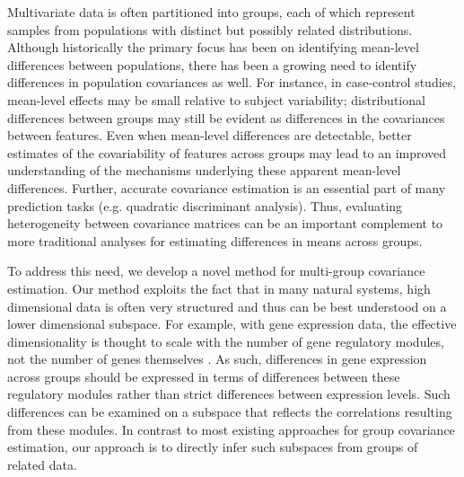 \documentclass[12pt]{article}
\begin{document}

Multivariate data is often partitioned into
groups, each of which represent samples from populations with
distinct but possibly related distributions.  Although historically the
primary focus has been on identifying mean-level differences between
populations, there has been a growing need to identify differences in
population covariances as well.  For instance, in case-control studies, mean-level effects may be small relative to subject
variability; distributional differences between groups may still be
evident as differences in the covariances between features.  Even when
mean-level differences are detectable, better estimates of the
covariability of features across groups may lead to an improved
understanding of the mechanisms underlying these apparent mean-level
differences.  Further, accurate covariance estimation is an essential
part of many prediction tasks (e.g. quadratic discriminant analysis).
Thus, evaluating heterogeneity between covariance
matrices can be an important complement to more traditional analyses
for estimating differences in means across
groups.

To address this need, we develop a novel method for
multi-group covariance estimation.  Our method exploits the fact that
in many natural systems, high dimensional data is often very
structured and thus can be best understood on a lower dimensional
subspace. For example, with gene expression data, the effective
dimensionality is thought to scale with the number of gene regulatory
modules, not the number of genes themselves \citep{Heimberg2016}.  As
such, differences in gene expression across groups should be expressed
in terms of differences between these regulatory modules rather than
strict differences between expression levels.  Such differences can be
examined on a subspace that reflects the correlations resulting from
these modules.  In contrast to most existing approaches for group
covariance estimation, our approach is to directly infer such
subspaces from groups of related data.
\end{document}
